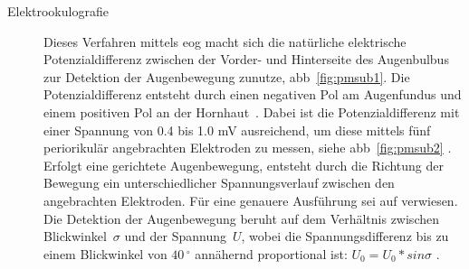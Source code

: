 \begin{description}
\item[Elektrookulografie] Dieses Verfahren mittels \acs{eog} macht sich die natürliche elektrische Potenzialdifferenz zwischen der Vorder- und Hinterseite des Augenbulbus zur Detektion der Augenbewegung zunutze, \vgl \acs{abb}~\ref{fig:pmsub1}. Die Potenzialdifferenz entsteht durch einen negativen Pol am Augenfundus und einem positiven Pol an der Hornhaut~\cite{Lupu2013,Barea2002}. Dabei ist die Potenzialdifferenz mit einer Spannung von 0.4 bis 1.0 mV ausreichend, um diese mittels fünf periorikulär angebrachten Elektroden zu messen, siehe \acs{abb}~\ref{fig:pmsub2} \cite{Lupu2013}. Erfolgt eine gerichtete Augenbewegung, entsteht durch die Richtung der Bewegung ein unterschiedlicher Spannungsverlauf zwischen den angebrachten Elektroden. Für eine genauere Ausführung sei auf \cite{Joos2003} verwiesen. Die Detektion der Augenbewegung beruht auf dem Verhältnis zwischen Blickwinkel~$\sigma$ und der Spannung~$U$, wobei die Spannungsdifferenz bis zu einem Blickwinkel von $40\,^\circ$ annähernd proportional ist: $U_0 = U_0 * sin \sigma$ \cite{Joos2003}. 


\end{description}
